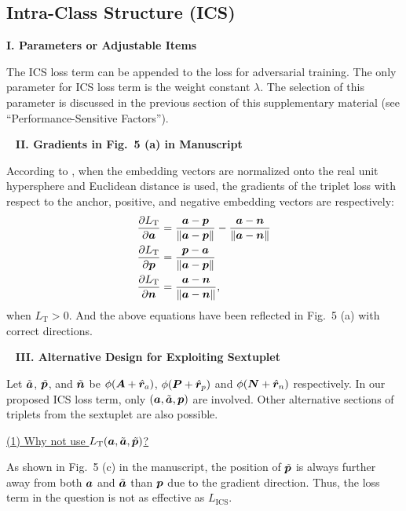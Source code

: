 
\subsection{Intra-Class Structure (ICS)}

\noindent\textbf{I. Parameters or Adjustable Items}

The ICS loss term can be appended to the loss for adversarial training.
%
The only parameter for ICS loss term is the weight constant $\lambda$.
%
The selection of this parameter is discussed in the previous section of this
supplementary material (see ``Performance-Sensitive Factors'').

~\newline
\noindent\textbf{II. Gradients in Fig.~5 (a) in Manuscript}

According to \cite{robrank}, when the embedding vectors are normalized onto the
real unit hypersphere and Euclidean distance is used, the gradients of the
triplet loss with respect to the anchor, positive, and negative embedding
vectors are respectively:
%
\begin{align}
%
	\frac{\partial L_\text{T}}{\partial \va} &= \frac{\va - \vp}{\|\va - \vp\|}
	- \frac{\va - \vn}{\| \va - \vn \|} \\
	\frac{\partial L_\text{T}}{\partial \vp} &= \frac{\vp - \va}{\|\va - \vp\|} \\
	\frac{\partial L_\text{T}}{\partial \vn} &= \frac{\va - \vn}{\|\va - \vn\|},
%
\end{align}
%
when $L_\text{T}>0$.
And the above equations have been reflected in Fig.~5 (a) with correct directions.

~\newline
\noindent\textbf{III. Alternative Design for Exploiting Sextuplet}

Let $\tilde{{\bm{a}}}$, $\tilde{{\bm{p}}}$, and $\tilde{{\bm{n}}}$ be $\phi({\bm{A}}+\hat{{\bm{r}}}_a)$,
$\phi({\bm{P}}+\hat{{\bm{r}}}_p)$ and $\phi({\bm{N}}+\hat{{\bm{r}}}_n)$ respectively.
%
In our proposed ICS loss term, only $({\bm{a}}, \tilde{{\bm{a}}}, {\bm{p}})$ are involved.
%
Other alternative sections of triplets from the sextuplet are also
possible.

\ul{(1) Why not use $L_\text{T}({\bm{a}}, \tilde{{\bm{a}}}, \tilde{{\bm{p}}})$? }

As shown in Fig.~5 (c) in the manuscript, the position of $\tilde{{\bm{p}}}$ is
always further away from both ${\bm{a}}$ and $\tilde{{\bm{a}}}$ than ${\bm{p}}$ due to
the gradient direction.
%
Thus, the loss term in the question is not as effective as $L_\text{ICS}$.

